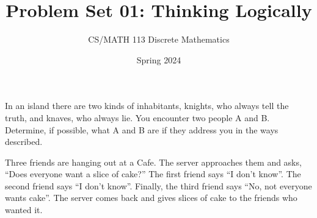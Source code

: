 \documentclass[a4paper]{exam}
\title{Problem Set 01: Thinking Logically}
\author{CS/MATH 113 Discrete Mathematics}
\date{Spring 2024}
\begin{document}
\maketitle

\begin{questions}

  \question In an island there are two kinds of inhabitants, knights, who always tell the truth, and knaves, who always lie. You encounter two people A and B. Determine, if possible, what A and B are if they address you in the ways described.
  
  \question Three friends are hanging out at a Cafe. The server approaches them and asks, ``Does everyone want a slice of cake?'' The first friend says ``I don’t know''. The second friend says ``I don’t know''. Finally, the third friend says ``No, not everyone wants cake''. The server comes back and gives slices of cake to the friends who wanted it. 


\end{questions}
\end{document}
